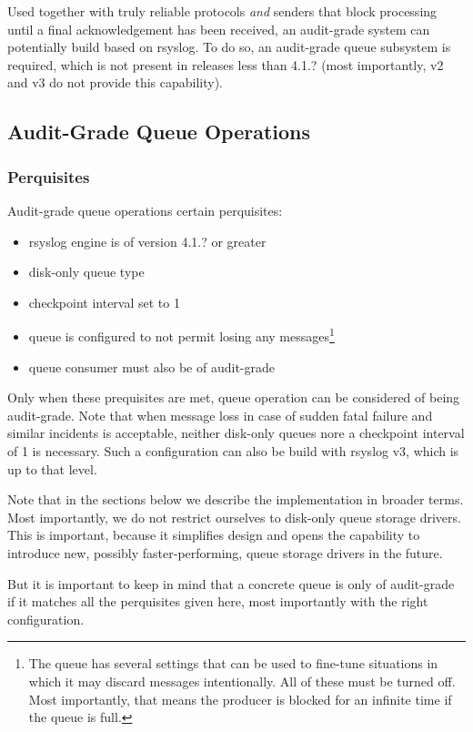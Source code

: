 \documentclass[a4paper,10pt]{article}
\begin{document}
Used together with truly reliable protocols \emph{and} senders that block processing until a final acknowledgement has been received, an audit-grade system can potentially build based on rsyslog. To do so, an audit-grade queue subsystem is required, which is not present in releases less than 4.1.? (most importantly, v2 and v3 do not provide this capability).

\subsection{Audit-Grade Queue Operations}
\subsubsection{Perquisites}
Audit-grade queue operations certain perquisites:
\begin{itemize}
\item rsyslog engine is of version 4.1.? or greater
\item disk-only queue type
\item checkpoint interval set to 1
\item queue is configured to not permit losing any messages\footnote{The queue has several settings that can be used to fine-tune situations in which it may discard messages intentionally. All of these must be turned off. Most importantly, that means the producer is blocked for an infinite time if the queue is full.}
\item queue consumer must also be of audit-grade
\end{itemize}
Only when these prequisites are met, queue operation can be considered of being audit-grade. Note that when message loss in case of sudden fatal failure and similar incidents is acceptable, neither disk-only queues nore a checkpoint interval of 1 is necessary. Such a configuration can also be build with rsyslog v3, which is up to that level.

Note that in the sections below we describe the implementation in broader terms. Most importantly, we do not restrict ourselves to disk-only queue storage drivers. This is important, because it simplifies design and opens the capability to introduce new, possibly faster-performing, queue storage drivers in the future.

But it is important to keep in mind that a concrete queue is only of audit-grade if it matches all the perquisites given here, most importantly with the right configuration.
\end{document}

